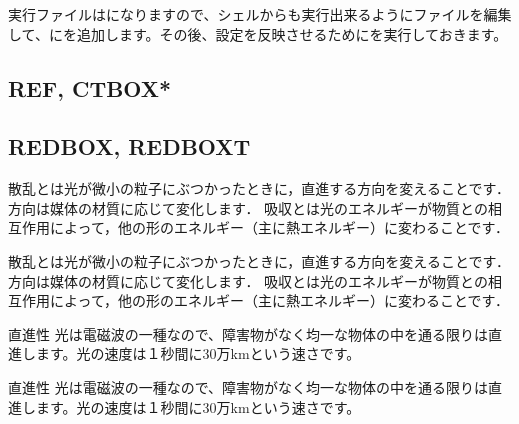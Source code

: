 \documentclass[../main]{subfiles}
\begin{document}
\begin{code}[language=tex]
実行ファイルはになりますので、シェルからも実行出来るようにファイルを編集して、にを追加します。その後、設定を反映させるためにを実行しておきます。
\end{code}

\leaderfill
\subsection{REF, CTBOX*}

\begin{code}[language=tex]
\end{code}

\leaderfill

\subsection{REDBOX, REDBOXT}
\begin{REDBOX}
散乱とは光が微小の粒子にぶつかったときに，直進する方向を変えることです．方向は媒体の材質に応じて変化します．
吸収とは光のエネルギーが物質との相互作用によって，他の形のエネルギー（主に熱エネルギー）に変わることです．
\end{REDBOX}
\begin{code}[language=tex]
\begin{REDBOX}
    散乱とは光が微小の粒子にぶつかったときに，直進する方向を変えることです．方向は媒体の材質に応じて変化します．
    吸収とは光のエネルギーが物質との相互作用によって，他の形のエネルギー（主に熱エネルギー）に変わることです．
\end{REDBOX}
\end{code}

\leaderfill

\begin{REDBOXT}{直進性}
光は電磁波の一種なので、障害物がなく均一な物体の中を通る限りは直進します。光の速度は１秒間に30万kmという速さです。
\end{REDBOXT}
\begin{code}[language=tex]
\begin{REDBOXT}{直進性}
    光は電磁波の一種なので、障害物がなく均一な物体の中を通る限りは直進します。光の速度は１秒間に30万kmという速さです。
\end{REDBOXT}
\end{code}
\end{document}
